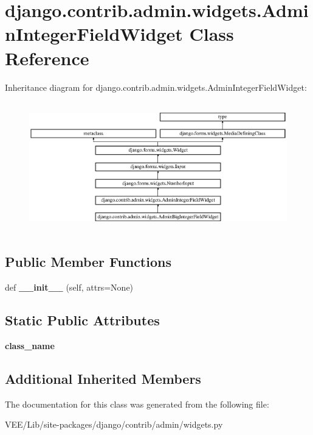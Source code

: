 \hypertarget{classdjango_1_1contrib_1_1admin_1_1widgets_1_1_admin_integer_field_widget}{}\section{django.\+contrib.\+admin.\+widgets.\+Admin\+Integer\+Field\+Widget Class Reference}
\label{classdjango_1_1contrib_1_1admin_1_1widgets_1_1_admin_integer_field_widget}
Inheritance diagram for django.\+contrib.\+admin.\+widgets.\+Admin\+Integer\+Field\+Widget\+:\begin{figure}[H]
\begin{center}
\leavevmode
\includegraphics[height=5.664740cm]{classdjango_1_1contrib_1_1admin_1_1widgets_1_1_admin_integer_field_widget}
\end{center}
\end{figure}
\subsection*{Public Member Functions}
\begin{DoxyCompactItemize}
\item 
\mbox{\label{classdjango_1_1contrib_1_1admin_1_1widgets_1_1_admin_integer_field_widget_a72dbf18f41aa7990f72b0087a40c6d3f}} 
def {\bfseries \+\_\+\+\_\+init\+\_\+\+\_\+} (self, attrs=None)
\end{DoxyCompactItemize}
\subsection*{Static Public Attributes}
\begin{DoxyCompactItemize}
\item 
\mbox{\label{classdjango_1_1contrib_1_1admin_1_1widgets_1_1_admin_integer_field_widget_a41e87dd2da45f3c2cd0574ba23917e54}} 
{\bfseries class\+\_\+name}
\end{DoxyCompactItemize}
\subsection*{Additional Inherited Members}


The documentation for this class was generated from the following file\+:\begin{DoxyCompactItemize}
\item 
V\+E\+E/\+Lib/site-\/packages/django/contrib/admin/widgets.\+py\end{DoxyCompactItemize}
